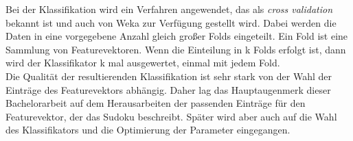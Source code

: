 Bei der Klassifikation wird ein Verfahren angewendet, das als \textit{cross validation} bekannt ist und auch von Weka zur Verfügung gestellt wird. Dabei werden die Daten in eine vorgegebene Anzahl gleich großer Folds eingeteilt. Ein Fold ist eine Sammlung von Featurevektoren. Wenn die Einteilung in k Folds erfolgt ist, dann wird der Klassifikator k mal ausgewertet, einmal mit jedem Fold.\\
Die Qualität der resultierenden Klassifikation ist sehr stark von der Wahl der Einträge des Featurevektors abhängig. Daher lag das Hauptaugenmerk dieser Bachelorarbeit auf dem Herausarbeiten der passenden Einträge für den Featurevektor, der das Sudoku beschreibt. Später wird aber auch auf die Wahl des Klassifikators und die Optimierung der Parameter eingegangen.\\